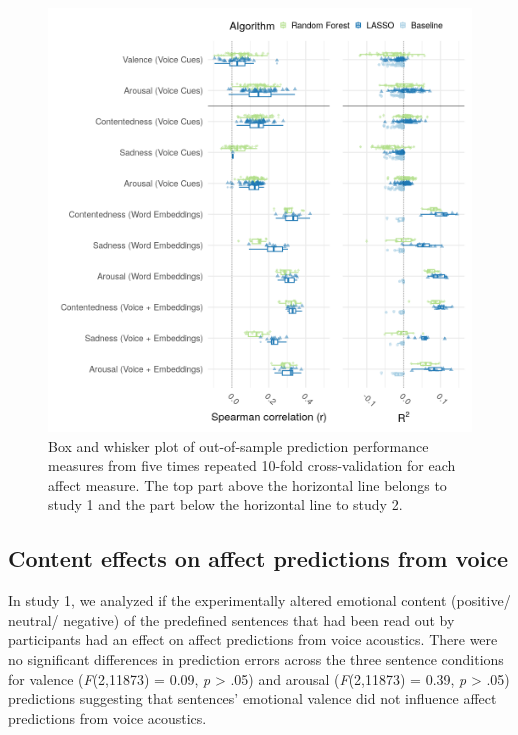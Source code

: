 \documentclass[
  english,
  man,floatsintext]{apa6}
\begin{document}
\begin{figure}

{\centering \includegraphics[width=1\linewidth,height=1\textheight]{../figures/bmr_plot} 

}

\caption[Prediction performance]{Box and whisker plot of out-of-sample prediction performance measures from five times repeated 10-fold cross-validation for each affect measure. The top part above the horizontal line belongs to study 1 and the part below the horizontal line to study 2.}\label{fig:predictionoverview}
\end{figure}

\hypertarget{content-effects-on-affect-predictions-from-voice}{%
\subsection{Content effects on affect predictions from voice}\label{content-effects-on-affect-predictions-from-voice}}

In study 1, we analyzed if the experimentally altered emotional content (positive/ neutral/ negative) of the predefined sentences that had been read out by participants had an effect on affect predictions from voice acoustics. There were no significant differences in prediction errors across the three sentence conditions for valence (\emph{F}(2,11873) = 0.09,
\emph{p} \textgreater{} .05) and arousal (\emph{F}(2,11873) = 0.39,
\emph{p} \textgreater{} .05) predictions suggesting that sentences' emotional valence did not influence affect predictions from voice acoustics.
\end{document}

